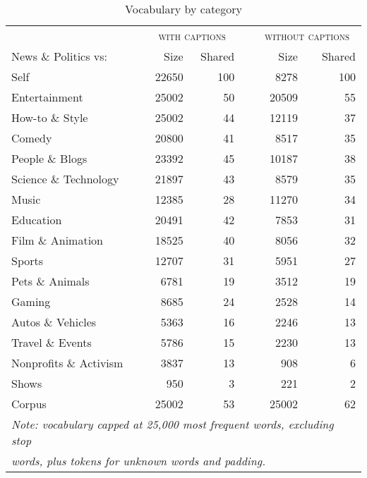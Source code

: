 \documentclass[letterpaper, 12pt]{article}
\begin{document}
\begin{table}[H]
  \centering
  \caption*{Vocabulary by category}
  \begin{tabular}{lrr@{\%}p{1em}rr@{\%}}
    \toprule
    & \multicolumn{2}{c}{\textsc{\enspace with captions \enspace}} & & \multicolumn{2}{c}{\textsc{without captions}} \\
    \cmidrule{2-3} \cmidrule{5-6}
    News \& Politics vs: & Size & \multicolumn{1}{r}{Shared} & & Size & \multicolumn{1}{r}{Shared} \\ 
    \midrule
    Self                    & 22650 & 100 & & 8278  & 100 \\ 
    \hline
    Entertainment           & 25002 & 50  & & 20509 & 55  \\
    How-to \& Style         & 25002 & 44  & & 12119 & 37  \\
    Comedy                  & 20800 & 41  & & 8517  & 35  \\
    People \& Blogs         & 23392 & 45  & & 10187 & 38  \\
    Science \& Technology   & 21897 & 43  & & 8579  & 35  \\
    Music                   & 12385 & 28  & & 11270 & 34  \\
    Education               & 20491 & 42  & & 7853  & 31  \\
    Film \& Animation       & 18525 & 40  & & 8056  & 32  \\
    Sports                  & 12707 & 31  & & 5951  & 27  \\
    \hline
    Pets \& Animals         & 6781  & 19  & & 3512  & 19  \\
    Gaming                  & 8685  & 24  & & 2528  & 14  \\
    Autos \& Vehicles       & 5363  & 16  & & 2246  & 13  \\
    Travel \& Events        & 5786  & 15  & & 2230  & 13  \\
    Nonprofits \& Activism  & 3837  & 13  & & 908   & 6   \\
    Shows                   & 950   & 3   & & 221   & 2   \\
    \hline
    Corpus                  & 25002 & 53  & & 25002 & 62  \\
    \bottomrule
    \multicolumn{6}{l}{\small\textit{Note: vocabulary capped at 25,000 most frequent words, excluding stop}} \\
    \multicolumn{6}{l}{\small\textit{words, plus tokens for unknown words and padding.}}
  \end{tabular}
\end{table}
\end{document}
